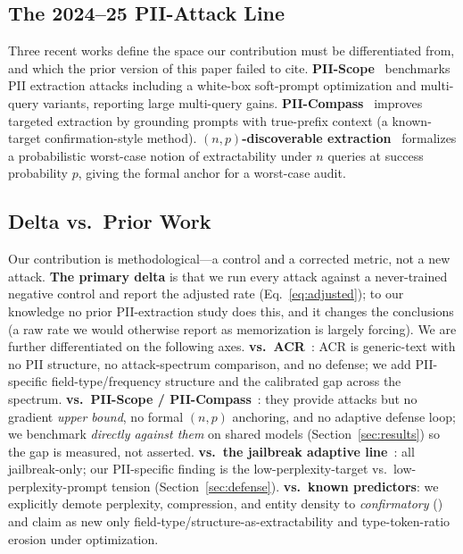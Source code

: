 \documentclass[letterpaper,twocolumn,10pt]{article}
\begin{document}
\subsection{The 2024--25 PII-Attack Line}
Three recent works define the space our contribution must be differentiated
from, and which the prior version of this paper failed to cite.
\textbf{PII-Scope}~\cite{piiscope2024} benchmarks PII extraction attacks
including a white-box soft-prompt optimization and multi-query variants,
reporting large multi-query gains. \textbf{PII-Compass}~\cite{piicompass2024}
improves targeted extraction by grounding prompts with true-prefix context (a
known-target confirmation-style method). \textbf{$(n,p)$-discoverable
extraction}~\cite{hayes2025np} formalizes a probabilistic worst-case notion of
extractability under $n$ queries at success probability $p$, giving the formal
anchor for a worst-case audit.

\subsection{Delta vs.\ Prior Work}
Our contribution is methodological---a control and a corrected metric, not a new
attack. \textbf{The primary delta} is that we run every attack against a
never-trained negative control and report the adjusted rate
(Eq.~\ref{eq:adjusted}); to our knowledge no prior PII-extraction study does
this, and it changes the conclusions (a raw rate we would otherwise report as
memorization is largely forcing). We are further differentiated on the following
axes. \textbf{vs.\ ACR}~\cite{schwarzschild2024rethinking}:
ACR is generic-text with no PII structure, no attack-spectrum comparison, and
no defense; we add PII-specific field-type/frequency structure and the
calibrated gap across the spectrum. \textbf{vs.\ PII-Scope /
PII-Compass}~\cite{piiscope2024,piicompass2024}: they provide attacks but no
gradient \emph{upper bound}, no formal $(n,p)$ anchoring, and no adaptive
defense loop; we benchmark \emph{directly against them} on shared models
(Section~\ref{sec:results}) so the gap is measured, not asserted.
\textbf{vs.\ the jailbreak adaptive line}~\cite{liu2023autodan,guo2024cold}:
all jailbreak-only; our PII-specific finding is the low-perplexity-target vs.\
low-perplexity-prompt tension (Section~\ref{sec:defense}).
\textbf{vs.\ known predictors}: we explicitly demote perplexity, compression,
and entity density to \emph{confirmatory}
(\cite{carlini2023quantifying, biderman2023emergent, schwarzschild2024rethinking})
and claim as new only field-type/structure-as-extractability and
type-token-ratio erosion under optimization.
\end{document}
